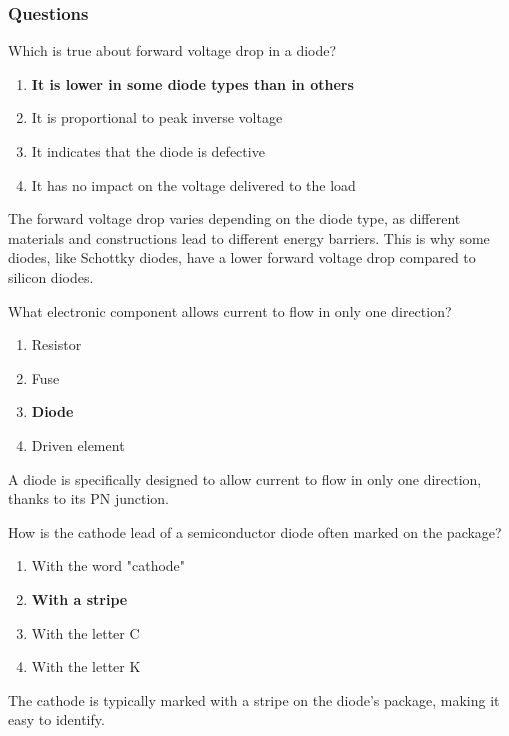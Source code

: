 \subsubsection{Questions}

\begin{tcolorbox}[colback=gray!10!white,colframe=black!75!black,title={T6B01}]
    Which is true about forward voltage drop in a diode?
    \begin{enumerate}[label=\Alph*),noitemsep]
        \item \textbf{It is lower in some diode types than in others}
        \item It is proportional to peak inverse voltage
        \item It indicates that the diode is defective
        \item It has no impact on the voltage delivered to the load
    \end{enumerate}
\end{tcolorbox}
The forward voltage drop varies depending on the diode type, as different materials and constructions lead to different energy barriers. This is why some diodes, like Schottky diodes, have a lower forward voltage drop compared to silicon diodes.

\begin{tcolorbox}[colback=gray!10!white,colframe=black!75!black,title={T6B02}]
    What electronic component allows current to flow in only one direction?
    \begin{enumerate}[label=\Alph*),noitemsep]
        \item Resistor
        \item Fuse
        \item \textbf{Diode}
        \item Driven element
    \end{enumerate}
\end{tcolorbox}
A diode is specifically designed to allow current to flow in only one direction, thanks to its PN junction.

\begin{tcolorbox}[colback=gray!10!white,colframe=black!75!black,title={T6B06}]
    How is the cathode lead of a semiconductor diode often marked on the package?
    \begin{enumerate}[label=\Alph*),noitemsep]
        \item With the word "cathode"
        \item \textbf{With a stripe}
        \item With the letter C
        \item With the letter K
    \end{enumerate}
\end{tcolorbox}
The cathode is typically marked with a stripe on the diode's package, making it easy to identify.

